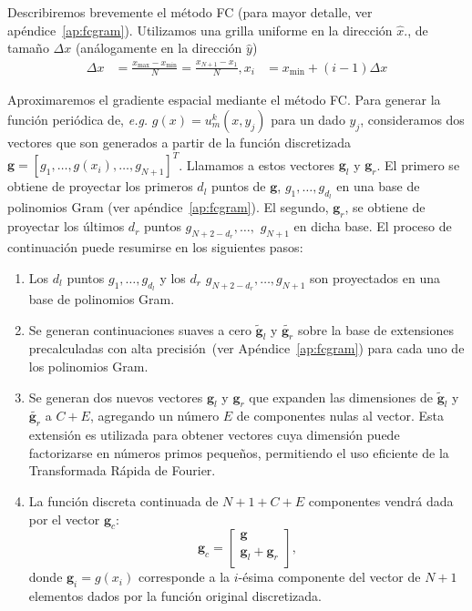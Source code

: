 Describiremos brevemente el método FC (para mayor detalle, ver apéndice~\ref{ap:fcgram}). 
Utilizamos una grilla uniforme en la dirección $\hat x$., 
de tamaño $\Delta x$ (análogamente en la dirección $\hat y$)
\begin{equation*}
\begin{aligned}
\Delta x &=\frac{x_{\text{max}}-x_{\text{min}}}{N} = \frac{x_{N+1} - x_1}{N} ,
x_i &=x_{\mathrm{min}}+(i-1)\Delta x
\end{aligned}
\end{equation*} 

Aproximaremos el gradiente espacial mediante el método FC.
Para generar la función periódica de, \textit{e.g.} $g(x)=u^k_m(x,y_j)$ para un dado $y_j$, 
consideramos dos vectores 
que son generados a partir de la función discretizada 
$\mathbf{g}=[g_1,\ldots,g(x_i),\ldots,g_{N+1}]^T$. Llamamos a estos vectores
$\mathbf{g}_l$ y $\mathbf{g}_r$. El primero 
se obtiene de proyectar los primeros $d_l$ puntos de $\mathbf{g}$, $g_1,\ldots,g_{d_l}$ 
en una base de polinomios Gram (ver apéndice~\ref{ap:fcgram}). El segundo, $\mathbf{g}_r$, se 
obtiene de proyectar los últimos $d_r$ puntos $g_{N+2-d_r},\ldots,$ $g_{N+1}$ en dicha base. 
El proceso de continuación puede resumirse en los siguientes pasos:
\begin{enumerate}
\item Los $d_l$ puntos $g_1,\ldots,g_{d_l}$
y los $d_r$ $g_{N+2-d_r},\ldots,g_{N+1}$ 
son proyectados en una base de polinomios Gram.

\item Se generan continuaciones suaves a cero
$\widetilde{\mathbf{g}}_l$ y 
$\widetilde{\mathbf{g}_r}$ sobre la base de extensiones 
precalculadas con alta precisión~(ver Apéndice~\ref{ap:fcgram})  
para cada uno de los polinomios Gram.

\item Se generan dos nuevos vectores $\mathbf{g}_l$ y $\mathbf{g}_r$ 
que expanden las dimensiones de $\widetilde{\mathbf{g}}_l$ y $\widetilde{\mathbf{g}_r}$
 a $C+E$, agregando un número $E$ de componentes nulas al vector. 
Esta extensión es utilizada para obtener vectores cuya 
dimensión puede factorizarse en números primos pequeños, 
permitiendo el uso eficiente de la Transformada Rápida de Fourier.

\item La función discreta continuada de $N+1+C+E$ componentes 
vendrá dada por el vector $\mathbf{g}_c$:  
\begin{equation*}
\mathbf{g}_c=
\begin{bmatrix}
    \mathbf{g} \\
    \mathbf{g}_l+\mathbf{g}_r  \\
\end{bmatrix}
,
\label{eq:FCStepsCondensed}
\end{equation*}
donde $\mathbf{g}_i=g(x_i)$ corresponde a la $i$-ésima componente del vector 
de $N+1$ elementos dados por la función original discretizada.
\end{enumerate}

